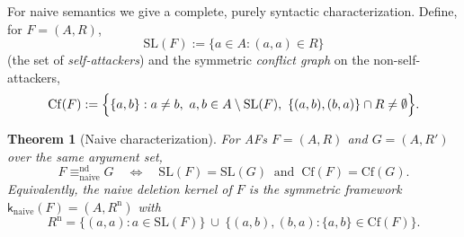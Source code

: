 \documentclass{amsart}
\newtheorem{theorem}{Theorem}
\theoremstyle{remark}
\begin{document}
For naive semantics we give a complete, purely syntactic characterization.
Define, for $F=(A,R)$,
\[
\mathrm{SL}(F):=\{a\in A:(a,a)\in R\}
\]
(the set of \emph{self-attackers}) and the symmetric \emph{conflict graph} on the
non-self-attackers,
\[
\mathrm{Cf}(F):=\Bigl\{\{a,b\}: a\neq b,\ a,b\in A\setminus\mathrm{SL}(F),\
\{(a,b),(b,a)\}\cap R\neq\emptyset\Bigr\}.
\]

\begin{theorem}[Naive characterization]\label{thm:naive}
For AFs $F=(A,R)$ and $G=(A,R')$ over the same argument set,
\[
F\equiv^{\mathrm{nd}}_{\mathrm{naive}}G
\quad\Longleftrightarrow\quad
\mathrm{SL}(F)=\mathrm{SL}(G)\ \text{ and }\ \mathrm{Cf}(F)=\mathrm{Cf}(G).
\]
Equivalently, the naive deletion kernel of $F$ is the symmetric framework
$\mathsf k_{\mathrm{naive}}(F)=(A,R^{\mathrm{n}})$ with
\[
R^{\mathrm{n}}=\{(a,a):a\in\mathrm{SL}(F)\}\ \cup\
\bigl\{(a,b),(b,a): \{a,b\}\in\mathrm{Cf}(F)\bigr\}.
\]
\end{theorem}
\end{document}
